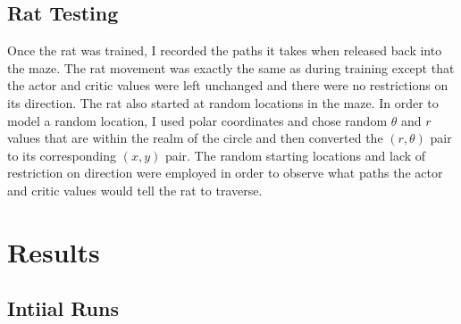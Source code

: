 \documentclass[conference]{IEEEtran}
\begin{document}
\subsection{Rat Testing}

Once the rat was trained, I recorded the paths it takes when released back into the maze. The rat movement was exactly the same as during training except that the actor and critic values were left unchanged and there were no restrictions on its direction. The rat also started at random locations in the maze. In order to model a random location, I used polar coordinates and chose random $\theta$ and $r$ values that are within the realm of the circle and then converted the $(r,\theta)$ pair to its corresponding $(x,y)$ pair. The random starting locations and lack of restriction on direction were employed in order to observe what paths the actor and critic values would tell the rat to traverse. 

\section{Results}

\subsection{Intiial Runs}
\end{document}
